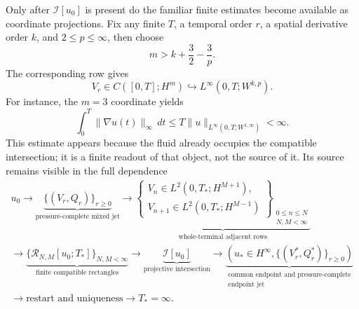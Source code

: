 Only after \(\mathcal I[u_0]\) is present do the familiar finite estimates
become available as coordinate projections.  Fix any finite \(T\), a temporal
order \(r\), a spatial derivative order \(k\), and \(2\le p\le\infty\), then
choose
\[
 m>k+\frac32-\frac3p.
\]
The corresponding row gives
\[
 V_r\in C([0,T];H^m)
 \hookrightarrow L^\infty(0,T;W^{k,p}).
\]
For instance, the \(m=3\) coordinate yields
\[
 \int_0^{T}\|\nabla u(t)\|_\infty\,dt
 \le T\|u\|_{L^\infty(0,T;W^{1,\infty})}<\infty.
\]
This estimate appears because the fluid already occupies the compatible
intersection; it is a finite readout of that object, not the source of it.
Its source remains visible in the full dependence
\[
\begin{gathered}
 u_0
 \longrightarrow
 \underbrace{\{(V_r,Q_r)\}_{r\ge0}}_{\text{pressure-complete mixed jet}}
 \longrightarrow
 \underbrace{\left\{
  \begin{gathered}
   V_n\in L^2(0,T_*;H^{M+1}),\\[-1pt]
   V_{n+1}\in L^2(0,T_*;H^{M-1})
  \end{gathered}
 \right\}_{\substack{0\le n\le N\\N,M<\infty}}}_{
 \text{whole-terminal adjacent rows}}
 \\
 \longrightarrow
 \underbrace{\{\mathcal R_{N,M}[u_0;T_*]\}_{N,M<\infty}}_{
 \text{finite compatible rectangles}}
 \longrightarrow
 \underbrace{\mathcal I[u_0]}_{\text{projective intersection}}
 \longrightarrow
 \underbrace{\left(
  u_*\in H^\infty,
  \{(V_r^*,Q_r^*)\}_{r\ge0}
 \right)}_{\substack{\text{common endpoint and pressure-complete}\\
                     \text{endpoint jet}}}
 \\
 \longrightarrow \text{restart and uniqueness}
 \longrightarrow T_*=\infty.
\end{gathered}
\]

\endgroup

